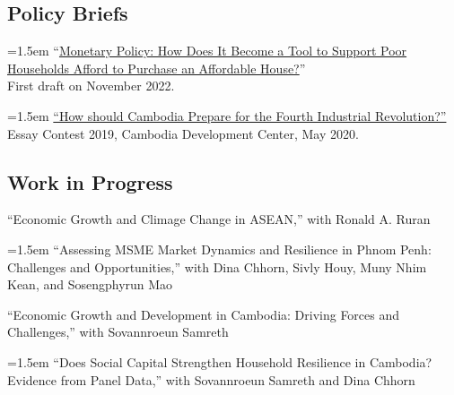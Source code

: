 \documentclass[10pt,a4paper]{article}
\begin{document}
\subsection*{Policy Briefs}
	
		\hangindent=1.5em
		“\href{}{Monetary Policy: How Does It Become a Tool to Support Poor Households Afford to Purchase an Affordable House?}” \\
		First draft on November 2022. \\ \vspace{-.5em}
	
		\hangindent=1.5em
		\href{https://cd-center.org/en/essay-contest-2019-first-place-winner/}{``How should Cambodia Prepare for the Fourth Industrial Revolution?''} \\
		Essay Contest 2019, Cambodia Development Center, May 2020.

\subsection*{Work in Progress}
	
	``Economic Growth and Climage Change in ASEAN,'' with Ronald A. Ruran\\ \vspace{-.5em}
	
	\hangindent=1.5em
	``Assessing MSME Market Dynamics and Resilience in Phnom Penh: Challenges and Opportunities,'' with Dina Chhorn, Sivly Houy, Muny Nhim Kean, and Sosengphyrun Mao\\ \vspace{-.5em}
	
	``Economic Growth and Development in Cambodia: Driving Forces and Challenges,'' with Sovannroeun Samreth\\ \vspace{-.5em}
	
	\hangindent=1.5em
	``Does Social Capital Strengthen Household Resilience in Cambodia? Evidence from Panel Data,'' with Sovannroeun Samreth and Dina Chhorn\\ \vspace{-.5em}
	
\end{document}
